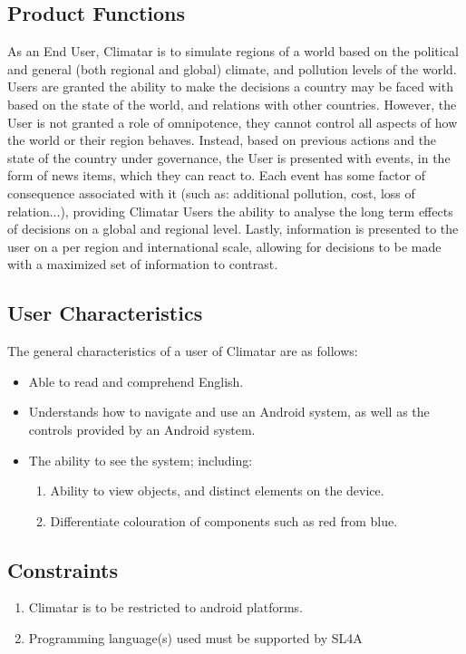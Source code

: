 \documentclass[]{article}
\begin{document}
\subsection{Product Functions}
\label{sub:product_functions}
As an End User, Climatar is to simulate regions of a world based on the political and general (both regional and global) climate, and pollution levels of the world.  Users are granted the ability to make the decisions a country may be faced with based on the state of the world, and relations with other countries. However, the User is not granted a role of omnipotence, they cannot control all aspects of how the world or their region behaves. Instead, based on previous actions and the state of the country under governance, the User is presented with events, in the form of news items, which they can react to. Each event has some factor of consequence associated with it (such as: additional pollution, cost, loss of relation...), providing Climatar Users the ability to analyse the long term effects of decisions on a global and regional level. Lastly, information is presented to the user on a per region and international scale, allowing for decisions to be made with a maximized set of information to contrast.

\subsection{User Characteristics}
\label{sub:user_characteristics}
The general characteristics of a user of Climatar are as follows:
\begin{itemize}
	\item Able to read and comprehend English.
	\item Understands how to navigate and use an Android system, as 	well as the controls provided by an Android system.
	\item The ability to see the system; including:
	\begin{enumerate}[-]
		\item Ability to view objects, and distinct elements on the device.
		\item Differentiate colouration of components such as red from blue.
	\end{enumerate}
\end{itemize}

\subsection{Constraints}
\label{sub:constraints}
\begin{enumerate}
	\item Climatar is to be restricted to android platforms.
	\item Programming language(s) used must be supported by SL4A
\end{enumerate}
\end{document}
